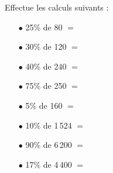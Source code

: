 Effectue les calculs suivants :
\begin{multicols}{2}
\begin{itemize}
\item[$\bullet$] 25\% de 80 $=$\dotfill
\item[$\bullet$] 30\% de 120 $=$\dotfill
\item[$\bullet$] 40\% de 240 $=$\dotfill
\item[$\bullet$] 75\% de 250 $=$\dotfill
\item[$\bullet$] 5\% de 160 $=$\dotfill
\item[$\bullet$] 10\% de 1\,524 $=$\dotfill
\item[$\bullet$] 90\% de 6\,200 $=$\dotfill
\item[$\bullet$] 17\% de 4\,400 $=$\dotfill
\end{itemize}
\end{multicols}

